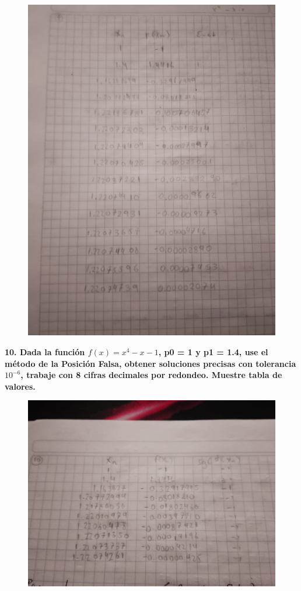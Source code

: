\documentclass[12pt]{article}
\begin{document}
\begin{figure}[H]
\centering
\includegraphics[width=1\textwidth]{./inFiles/Figures/2.jpeg}
\end{figure}



\textbf{10. Dada la función $f(x) = x^4-x- 1$, p0 = 1 y p1 = 1.4, use el método de la Posición Falsa, obtener soluciones precisas con tolerancia $10^{-6}$, trabaje con 8 cifras decimales por redondeo. Muestre tabla de valores.} 

\begin{figure}[H]
\centering
\includegraphics[width=1\textwidth]{./inFiles/Figures/1.jpeg}
\end{figure}
\end{document}
